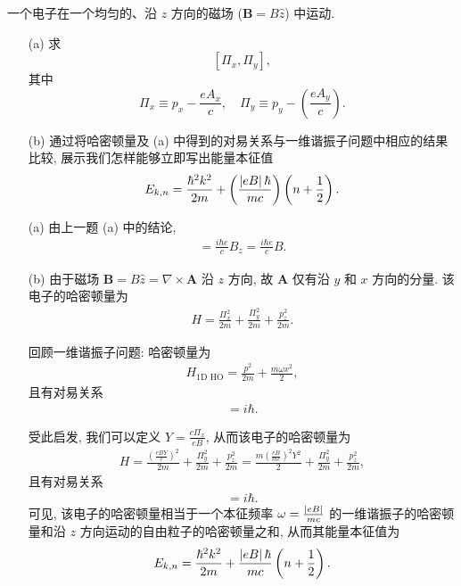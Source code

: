 \documentclass{assignment}
\begin{document}
\begin{prob}[课本习题 2.39]
    一个电子在一个均匀的、沿 $z$ 方向的磁场 ($\bm{B}=B\hat{z}$) 中运动.
    \begin{itemize}
        \item[(a)] 求
        \[
            [\Pi_x,\Pi_y],
        \]
        其中
        \[
            \Pi_x\equiv p_x-\frac{eA_x}{c},\quad\Pi_y\equiv p_y-\left(\frac{eA_y}{c}\right).
        \]
        \item[(b)] 通过将哈密顿量及 (a) 中得到的对易关系与一维谐振子问题中相应的结果比较, 展示我们怎样能够立即写出能量本征值
        \[
            E_{k,n}=\frac{\hbar^2k^2}{2m}+\left(\frac{\left\lvert eB\right\rvert\hbar}{mc}\right)\left(n+\frac{1}{2}\right).
        \]
    \end{itemize}
\end{prob}
\begin{sol}
    \begin{itemize}
        \item[(a)] 由上一题 (a) 中的结论,
        \begin{align}
            [\Pi_x,\Pi_y]=\frac{i\hbar e}{c}B_z=\frac{i\hbar e}{c}B.
        \end{align}
        \item[(b)] 由于磁场 $\bm{B}=B\hat{z}=\nabla\times\bm{A}$ 沿 $z$ 方向, 故 $\bm{A}$ 仅有沿 $y$ 和 $x$ 方向的分量. 该电子的哈密顿量为
        \begin{align}
            H=\frac{\Pi_x^2}{2m}+\frac{\Pi_y^2}{2m}+\frac{p_z^2}{2m}.
        \end{align}

        回顾一维谐振子问题: 哈密顿量为
        \begin{align}
            H_{\text{1D HO}}=\frac{p^2}{2m}+\frac{m\omega x^2}{2},
        \end{align}
        且有对易关系
        \begin{align}
            [x,p]=i\hbar.
        \end{align}

        受此启发, 我们可以定义 $Y=\frac{c\Pi_x}{eB}$, 从而该电子的哈密顿量为
        \begin{align}
            H=\frac{\left(\frac{eBY}{c}\right)^2}{2m}+\frac{\Pi_y^2}{2m}+\frac{p_z^2}{2m}=\frac{m\left(\frac{eB}{mc}\right)^2Y^2}{2}+\frac{\Pi_y^2}{2m}+\frac{p_z^2}{2m},
        \end{align}
        且有对易关系
        \begin{align}
            [Y,\Pi_y]=i\hbar.
        \end{align}
        可见, 该电子的哈密顿量相当于一个本征频率 $\omega=\frac{\left\lvert eB\right\rvert}{mc}$ 的一维谐振子的哈密顿量和沿 $z$ 方向运动的自由粒子的哈密顿量之和, 从而其能量本征值为
        \begin{align}
            E_{k,n}=\frac{\hbar^2k^2}{2m}+\frac{\left\lvert eB\right\rvert\hbar}{mc}\left(n+\frac{1}{2}\right).
        \end{align}
    \end{itemize}
\end{sol}
\end{document}
